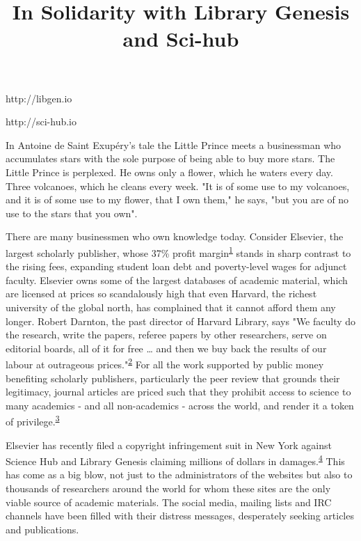 \documentclass[11pt,a4paper]{article}
\title{In Solidarity with Library Genesis and Sci-hub}
\begin{document}
\maketitle

http://libgen.io

http://sci-hub.io

In Antoine de Saint Exupéry's tale the Little Prince meets a businessman
who accumulates stars with the sole purpose of being able to buy more
stars. The Little Prince is perplexed. He owns only a flower, which he
waters every day. Three volcanoes, which he cleans every week. {"It is
of some use to my volcanoes, and it is of some use to my flower, that I
own them,"} he says, {"but you are of no use to the stars that you
own"}.

There are many businessmen who own knowledge today. Consider Elsevier,
the largest scholarly publisher, whose 37\% profit
margin\textsuperscript{\protect\hyperlink{fn-1}{1}} stands in sharp
contrast to the rising fees, expanding student loan debt and
poverty-level wages for adjunct faculty. Elsevier owns some of the
largest databases of academic material, which are licensed at prices so
scandalously high that even Harvard, the richest university of the
global north, has complained that it cannot afford them any longer.
Robert Darnton, the past director of Harvard Library, says {"We faculty
do the research, write the papers, referee papers by other researchers,
serve on editorial boards, all of it for free \ldots{} and then we buy
back the results of our labour at outrageous
prices."}\textsuperscript{\protect\hyperlink{fn-2}{2}} For all the work
supported by public money benefiting scholarly publishers, particularly
the peer review that grounds their legitimacy, journal articles are
priced such that they prohibit access to science to many academics - and
all non-academics - across the world, and render it a token of
privilege.\textsuperscript{\protect\hyperlink{fn-3}{3}}

Elsevier has recently filed a copyright infringement suit in New York
against Science Hub and Library Genesis claiming millions of dollars in
damages.\textsuperscript{\protect\hyperlink{fn-4}{4}} This has come as a
big blow, not just to the administrators of the websites but also to
thousands of researchers around the world for whom these sites are the
only viable source of academic materials. The social media, mailing
lists and IRC channels have been filled with their distress messages,
desperately seeking articles and publications.
\end{document}
